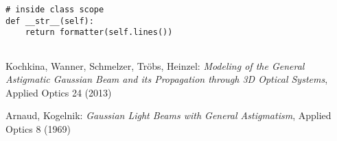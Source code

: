\documentclass{article}
\begin{document}
\begin{lstlisting}
# inside class scope
def __str__(self):
	return formatter(self.lines())
	
\end{lstlisting}

\begin{thebibliography}{99} 

Kochkina, Wanner, Schmelzer, Tr\"obs, Heinzel:
\textit{Modeling of the General Astigmatic Gaussian Beam and its Propagation through 3D Optical Systems},
Applied Optics 24 (2013)

Arnaud, Kogelnik:
\textit{Gaussian Light Beams with General Astigmatism},
Applied Optics 8 (1969)

\end{thebibliography}
\end{document}
